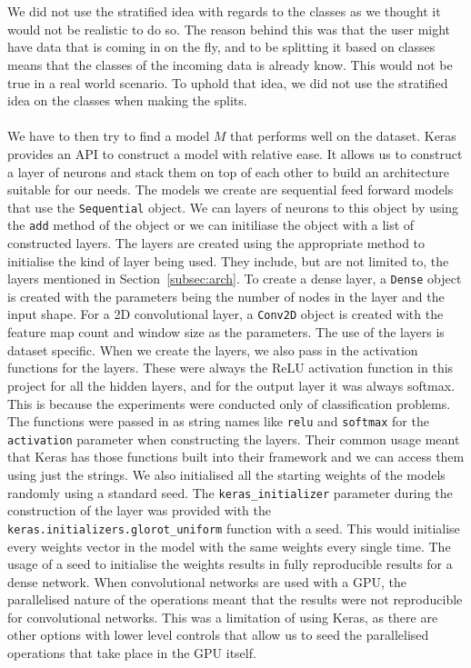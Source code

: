 \documentclass[12pt]{article}
\begin{document}
\\\\
We did not use the stratified idea with regards to the classes as we thought it would not be realistic to do so. The reason behind this was that the user might have data that is coming in on the fly, and to be splitting it based on classes means that the classes of the incoming data is already know. This would not be true in a real world scenario. To uphold that idea, we did not use the stratified idea on the classes when making the splits.
\\\\
We have to then try to find a model $M$ that performs well on the dataset. Keras provides an API to construct a model with relative ease. It allows us to construct a layer of neurons and stack them on top of each other to build an architecture suitable for our needs. The models we create are sequential feed forward models that use the \texttt{Sequential} object. We can layers of neurons to this object by using the \texttt{add} method of the object or we can initiliase the object with a list of constructed layers. The layers are created using the appropriate method to initialise the kind of layer being used. They include, but are not limited to, the layers mentioned in Section~\ref{subsec:arch}. To create a dense layer, a \texttt{Dense} object is created with the parameters being the number of nodes in the layer and the input shape. For a 2D convolutional layer, a \texttt{Conv2D} object is created with the feature map count and window size as the parameters. The use of the layers is dataset specific. When we create the layers, we also pass in the activation functions for the layers. These were always the ReLU activation function in this project for all the hidden layers, and for the output layer it was always softmax. This is because the experiments were conducted only of classification problems. The functions were passed in as string names like \texttt{relu} and \texttt{softmax} for the \texttt{activation} parameter when constructing the layers. Their common usage meant that Keras has those functions built into their framework and we can access them using just the strings. We also initialised all the starting weights of the models randomly using a standard seed. The \texttt{keras\_initializer} parameter during the construction of the layer was provided with the \texttt{keras.initializers.glorot\_uniform} function with a seed. This would initialise every weights vector in the model with the same weights every single time. The usage of a seed to initialise the weights results in fully reproducible results for a dense network. When convolutional networks are used with a GPU, the parallelised nature of the operations meant that the results were not reproducible for convolutional networks. This was a limitation of using Keras, as there are other options with lower level controls that allow us to seed the parallelised operations that take place in the GPU itself. 
\end{document}
